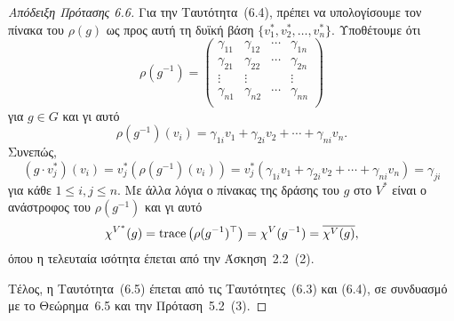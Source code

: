 \documentclass[12pt,a4paper,reqno]{amsart}
\begin{document}
\begin{proof}[Απόδειξη Πρότασης 6.6]
    Για την Ταυτότητα~(6.4), πρέπει να υπολογίσουμε τον πίνακα του $\rho(g)$ ως προς αυτή τη δυϊκή βάση $\{v_1^\ast, v_2^\ast, \dots, v_n^\ast\}$. Υποθέτουμε ότι  
    \[
    \rho(g^{-1}) = 
    \begin{pmatrix}
        \gamma_{11} & \gamma_{12} & \cdots & \gamma_{1n} \\
        \gamma_{21} & \gamma_{22} & \cdots & \gamma_{2n} \\
        \vdots      & \vdots      &        & \vdots \\
        \gamma_{n1} & \gamma_{n2} & \cdots & \gamma_{nn} \\
    \end{pmatrix}
    \]
    για $g \in G$ και γι αυτό
    \[
    \rho(g^{-1})(v_i) = \gamma_{1i}v_1 + \gamma_{2i}v_2 + \cdots + \gamma_{ni}v_n.
    \]
    Συνεπώς,
    \[
    \left(g \cdot v_j^\ast\right)(v_i) 
    = v_j^\ast\left(\rho(g^{-1})(v_i)\right) 
    = v_j^\ast(\gamma_{1i}v_1 + \gamma_{2i}v_2 + \cdots + \gamma_{ni}v_n) 
    = \gamma_{ji}
    \]
    για κάθε $1 \le i, j \le n$. Με άλλα λόγια ο πίνακας της δράσης του $g$ στο $V^\ast$ είναι ο ανάστροφος του $\rho(g^{-1})$ και γι αυτό 
    \[
    \chi^{V^\ast}(g) = \mathrm{trace}\left(\rho(g^{-1})^\top\right) = \chi^V(g^{-1}) = \overline{\chi^V(g)},
    \]
    όπου η τελευταία ισότητα έπεται από την Άσκηση~2.2~(2).

    Τέλος, η Ταυτότητα~(6.5) έπεται από τις Ταυτότητες~(6.3) και (6.4), σε συνδυασμό με το Θεώρημα~6.5 και την Πρόταση~5.2~(3). 
\end{proof}
\end{document}
